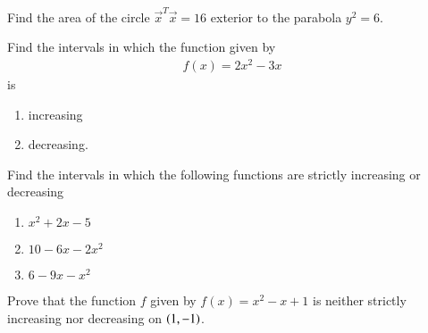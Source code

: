%
\item Find the area of the circle $\vec{x}^T\vec{x} = 16$ exterior to the parabola $y^2 = 6$.
%
\item Find the intervals in which the function given by 
\begin{align}
f(x)  = 2x^2-3x
\end{align}
%
is 
\begin{enumerate}
\item increasing
\item decreasing.
\end{enumerate}
%
\item Find the intervals in which the following functions are strictly increasing or decreasing
%
\begin{enumerate}
\item $x^2+2x-5$
\item $10-6x-2x^2$
\item $6-9x-x^2$
\end{enumerate}
%
\item Prove that the function $f$ given by $f(x) = x^2-x+1$ is neither strictly increasing nor decreasing on $\left(1,-1\right)$.
